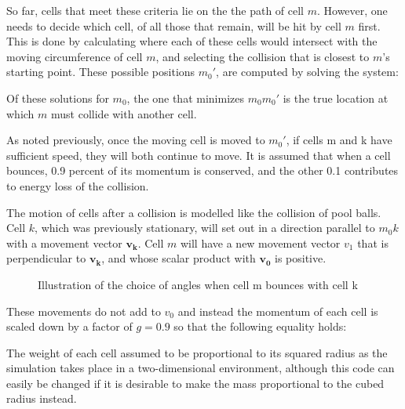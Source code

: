 \documentclass[12pt]{article}
\begin{document}
So far, cells that meet these criteria lie on the the path of cell 
\(m\). However, one needs to decide which cell, of all those 
that remain, will be hit by cell \(m\) first. This is done by 
calculating where each of these cells would intersect with the moving 
circumference of cell \(m\), and selecting the collision that is closest to 
\(m\)'s starting point. These possible positions \(m_0'\), 
are computed by solving the system:

\begin{figure}[H]
\centering
\end{figure}

Of these solutions for \(m_0\), the one that minimizes \(m_0m_0'\) 
is the true location at which \(m\) must collide with another 
cell. 

As noted previously, once the moving cell is moved to \(m_0'\), if 
cells m and k have sufficient speed, they will both continue to move. It 
is assumed that when a cell bounces, 0.9 percent of its momentum is 
conserved, and the other 0.1 contributes to energy loss of the 
collision. 

The motion of cells after a collision is modelled like the collision of 
pool balls. Cell \(k\), which was previously stationary, will 
set out in a direction parallel to \(m_0k\) with a movement vector \(\mathbf{v
_k}\). Cell \(m\) will have a new movement vector \(v_1\) 
that is perpendicular to \(\mathbf{v_k}\), and whose scalar product with \(\mathbf{v_0}\) 
is positive.

\begin{figure}[H]
\centering
\caption{Illustration of the choice of angles when 
cell m bounces with cell k}
\end{figure}

These movements do not add to \(v_0\) and instead the momentum of 
each cell is scaled down by a factor of \(g = 0.9\) so that the following 
equality holds:

\begin{figure}[H]
\centering
\end{figure}

The weight of each cell assumed to be proportional to its squared radius 
as the simulation takes place in a two-dimensional environment, although 
this code can easily be changed if it is desirable to make the mass 
proportional to the cubed radius instead.
\end{document}
